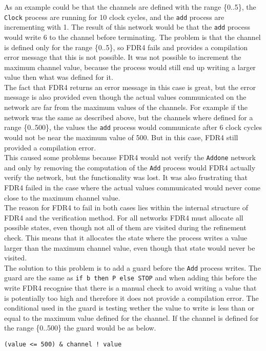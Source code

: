 As an example could be that the channels are defined with the range \{0..5\}, the \texttt{Clock} process are running for 10 clock cycles, and the \texttt{add} process are incrementing with 1.
The result of this network would be that the \texttt{add} process would write 6 to the channel before terminating. The problem is that the channel is defined only for the range \{0..5\}, so FDR4 fails and provides a compilation error message that this is not possible. It was not possible to increment the maximum channel value, because the process would still end up writing a larger value then what was defined for it.\\

The fact that FDR4 returns an error message in this case is great, but the error message is also provided even though the actual values communicated on the network are far from the maximum values of the channels. For example if the network was the same as described above, but the channels where defined for a range \{0..500\}, the values the \texttt{add} process would communicate after 6 clock cycles would not be near the maximum value of 500. But in this case, FDR4 still provided a compilation error. \\

This caused some problems because FDR4 would not verify the \texttt{Addone} network and only by removing the computation of the \texttt{Add} process would FDR4 actually verify the network, but the functionality was lost.
It was also frustrating that FDR4 failed in the case where the actual values communicated would never come close to the maximum channel value.\\

The reason for FDR4 to fail in both cases lies within the internal structure of FDR4 and the verification method. For all networks FDR4 must allocate all possible states, even though not all of them are visited during the refinement check. This means that it allocates the state where the process writes a value larger than the maximum channel value, even though that state would never be visited.\\

The solution to this problem is to add a guard before the \texttt{Add} process writes. The \cspm{} guard are the same as \texttt{if b then P else STOP} and when adding this before the write FDR4 recognise that there is a manual check to avoid writing a value that is potentially too high and therefore it does not provide a compilation error. The conditional used in the guard is testing wether the value to write is less than or equal to the maximum value defined for the channel. If the channel is defined for the range \{0..500\} the guard would be as below.
\begin{verbatim}
(value <= 500) & channel ! value
\end{verbatim}

